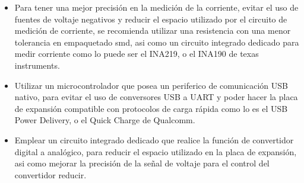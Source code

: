\begin{itemize}
    \item Para tener una mejor precisión en la medición de la corriente, evitar el uso
    de fuentes de voltaje negativos y reducir el espacio utilizado por el
    circuito de medición de corriente,
    se recomienda utilizar una resistencia con una menor tolerancia en empaquetado smd, asi como un 
    circuito integrado dedicado para medir corriente como lo puede ser el INA219, 
    o el INA190 de texas instruments.

    \item Utilizar un microcontrolador que posea un periferico de comunicación
    USB nativo, para evitar el uso de conversores USB a UART y poder hacer la placa 
    de expansión compatible con protocolos de carga rápida como lo es el USB Power
    Delivery, o el Quick Charge de Qualcomm.

    \item Emplear un circuito integrado dedicado que realice la función de 
    convertidor digital a analógico, para reducir el espacio utilizado en la placa
    de expansión, asi como mejorar la precisión de la señal de voltaje para el control
    del convertidor reducir.

\end{itemize}
